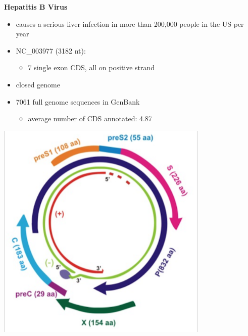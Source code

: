 \documentclass[landscape]{slides}
\begin{document}
\begin{slide}
\begin{center}
\textbf{Hepatitis B Virus}

\begin{minipage}[c]{6in}
\tiny
\begin{itemize}
\item causes a serious liver infection in more than 200,000 people in
  the US per year
\item NC\_003977 (3182 nt):
  \begin{itemize}
    \item 7 single exon CDS, all on positive strand
  \end{itemize}
\item closed genome
\item 7061 full genome sequences in GenBank
\begin{itemize}
  \item average number of CDS annotated: 4.87
\end{itemize}
\end{itemize}
\vspace{3in}
\end{minipage}
\begin{minipage}[c]{4in}
\includegraphics[width=4in]{figs/hbv-genome-small-lowres}
\vspace{3in}
\end{minipage}

\vfill
\end{center}
\end{slide}
\end{document}
